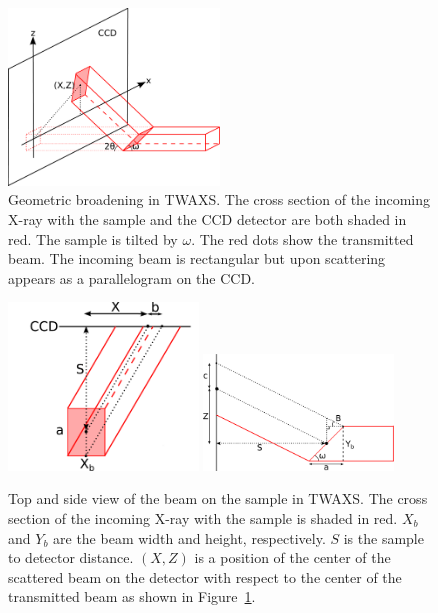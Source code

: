 \begin{figure}[htbp]
  \centering
  \includegraphics[width=0.5\textwidth]{figures/ripple/MMs/transmission/geometric_broadening1}
  \caption[Geometric broadening in TWAXS]{Geometric broadening in TWAXS. 
  The cross section of the incoming X-ray with the sample and the CCD 
  detector are both shaded in red. The sample is tilted by $\omega$.
  The red dots show the transmitted beam. The incoming beam is rectangular
  but upon scattering appears as a parallelogram on the CCD.}
  \label{fig:gb_trans1}
\end{figure}

\begin{figure}[htbp]
  \centering
  \includegraphics[width=0.45\textwidth]{figures/ripple/MMs/transmission/geometric_broadening2}
  \includegraphics[width=0.45\textwidth]{figures/ripple/MMs/transmission/geometric_broadening3}
  \caption[Top and side view of the beam on the sample in TWAXS]{Top and side 
  view of the beam on the sample in TWAXS. The cross section of the incoming X-ray 
  with the sample is shaded in red. 
  $X_b$ and $Y_b$ are the beam width and height, respectively. 
  $S$ is the sample to detector distance. 
  $(X,Z)$ is a  
	position of the center of the scattered beam on the detector with respect 
	to the center of the transmitted beam as shown in 
	Figure~\ref{fig:gb_trans1}.}
  \label{fig:gb_trans2}
\end{figure}

